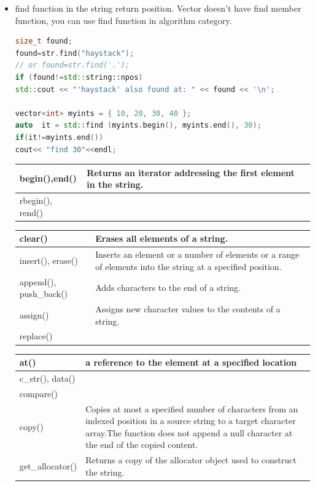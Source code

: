 \documentclass[a4paper,11pt,twoside]{book}
\newcommand{\tophline}{\hline }
\newcommand{\bottomhline}{\\ \hline }
\newcommand{\tophline}{ }
\newcommand{\bottomhline}{ }
\begin{document}
\begin{itemize}
	\item find function in the string return position. Vector doesn't have find member function, you can use find function in  algorithm category.
	
\begin{lstlisting}[frame=single, language=c++]
size_t found;
found=str.find("haystack");
// or found=str.find('.');
if (found!=std::string::npos)
std::cout << "'haystack' also found at: " << found << '\n';
	
vector<int> myints = { 10, 20, 30, 40 };
auto  it = std::find (myints.begin(), myints.end(), 30);
if(it!=myints.end())
cout<< "find 30"<<endl;
\end{lstlisting}
	
	
	\begin{tabular}{| p{} |p{}|}
		\tophline
		begin(),end() & Returns an iterator addressing the first element in the string.\\
		\tophline
		rbegin(), rend() & \bottomhline
		
	\end{tabular}
	
	
	\begin{tabular}{| p{} |p{}|}
		\tophline
		clear()& Erases all elements of a string.\\
		\tophline
		insert(), erase() & Inserts an element or a number of elements or a range of elements into the string at a specified position.\\
		\tophline
		append(), push\_back() & Adds characters to the end of a string.\\
		\tophline
		assign() &Assigns new character values to the contents of a string.\\
		\tophline
		replace() & \bottomhline
	\end{tabular}
	
	\begin{tabular}{| p{} |p{}|}
		
		\tophline
		at() & a reference to the element at a specified location \\
		\tophline
		c\_str(), data() & \\
		\tophline
		compare()& \\
		\tophline
		copy() & Copies at most a specified number of characters from an indexed position in a source string to a target character array.The function does not append a null character at the end of the copied content.
		\\
		\tophline
		get\_allocator() & Returns a copy of the allocator object used to construct the string.\\
		

\end{tabular}
\end{itemize}
\end{document}
